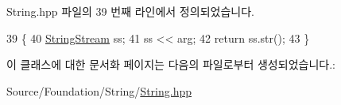 String.\+hpp 파일의 39 번째 라인에서 정의되었습니다.


\begin{DoxyCode}
39                                                        \{
40             \hyperlink{namespacecpf_a6e5583a51165e808f1a480563a2d98b2}{StringStream} ss;
41             ss << arg;
42             \textcolor{keywordflow}{return} ss.str();
43         \}
\end{DoxyCode}


이 클래스에 대한 문서화 페이지는 다음의 파일로부터 생성되었습니다.\+:\begin{DoxyCompactItemize}
\item 
Source/\+Foundation/\+String/\hyperlink{_string_8hpp}{String.\+hpp}\end{DoxyCompactItemize}
